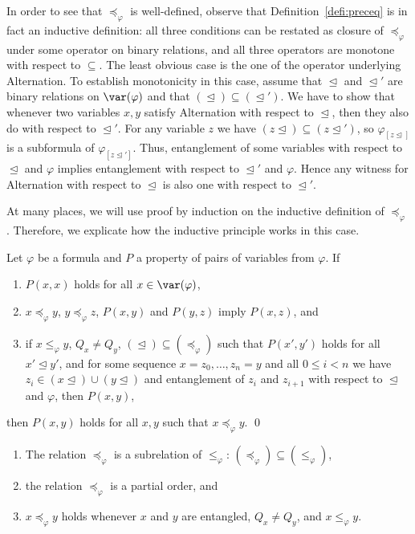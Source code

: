 \documentclass{LMCS}
\renewcommand{\phi}{\varphi}
\newcommand{\alt}{Alternation}
\begin{document}
\noindent In order to see that $\preceq_{\phi}$ is well-defined, 
observe that Definition~\ref{defi:preceq} is in fact an inductive definition: 
all three conditions can be restated as closure of $\preceq_{\phi}$ 
under some operator on binary relations, 
and all three operators are monotone with respect to $\subseteq$. 
The least obvious case is the one of the operator underlying \alt. 
To establish monotonicity in this case, 
assume that $\trianglelefteq$ and $\trianglelefteq'$ 
are binary relations on $\var(\phi)$ 
and that $(\trianglelefteq) \subseteq (\trianglelefteq')$. 
We have to show that whenever two variables $x,y$ 
satisfy \alt{} with respect to $\trianglelefteq$, 
then they also do with respect to $\trianglelefteq'$. 
For any variable $z$ 
we have $(z\trianglelefteq) \subseteq (z\trianglelefteq')$, 
so $\phi_{[z\trianglelefteq]}$ is a subformula of $\phi_{[z\trianglelefteq']}$. 
Thus, entanglement of some variables 
with respect to $\trianglelefteq$ and $\phi$ 
implies entanglement with respect to $\trianglelefteq'$ and $\phi$. 
Hence any witness for \alt{} with respect to $\trianglelefteq$ 
is also one with respect to $\trianglelefteq'$. 

At many places, we will use proof by induction 
on the inductive definition of $\preceq_{\phi}$. 
Therefore, we explicate how the inductive principle works in this case. 

\begin{lem}\label{lem:induction}
Let $\phi$ be a formula and $P$ a property of pairs of variables from $\phi$. 
If 
\begin{enumerate}[\em(1)]
\item $P(x,x)$ holds for all $x\in\var(\phi)$, 
\item $x\preceq_{\phi}y$, $y\preceq_{\phi}z$, $P(x,y)$ and $P(y,z)$ 
  imply $P(x,z)$, and 
\item if $x\leq_{\phi}y$, $Q_x\not=Q_y$, 
  $(\trianglelefteq)\subseteq(\preceq_{\phi})$ 
  such that $P(x',y')$ holds for all $x'\trianglelefteq y'$, 
  and for some sequence $x=z_0,\ldots,z_n=y$ and all $0\leq i<n$ 
  we have $z_i\in(x\trianglelefteq)\cup(y\trianglelefteq)$ 
  and entanglement of $z_i$ and $z_{i+1}$ 
  with respect to $\trianglelefteq$ and $\phi$, 
  then $P(x,y)$, 
\end{enumerate}
then $P(x,y)$ holds for all $x,y$ such that $x\preceq_{\phi}y$. 
\qed\end{lem}

\begin{rem}\label{rem:preceq-properties}\hfill
\begin{enumerate}[(1)]
\item The relation $\preceq_{\phi}$ is a subrelation of $\leq_{\phi}$: 
  $(\preceq_{\phi})\subseteq(\leq_{\phi})$,
\item the relation $\preceq_{\phi}$ is a partial order, and
\item $x\preceq_{\phi}y$ holds whenever $x$ and $y$ are entangled, 
  $Q_x\not=Q_y$, and $x\leq_{\phi}y$.
\end{enumerate}
\end{rem}
\end{document}
